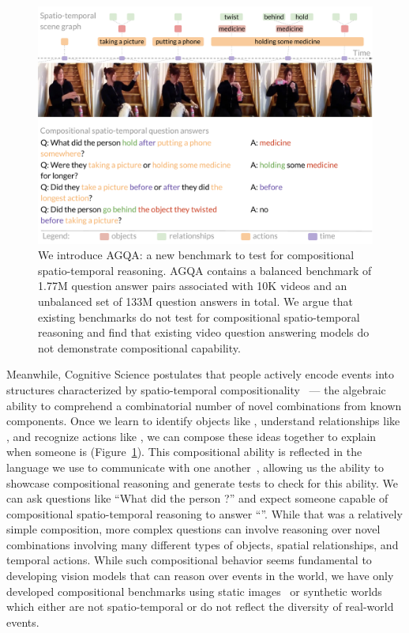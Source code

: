 \begin{figure}[t]
    \centering
    \includegraphics[width=\columnwidth]{figures/pull.pdf}
    \caption{We introduce AGQA: a new benchmark to test for compositional spatio-temporal reasoning. AGQA contains a balanced benchmark of 1.77M question answer pairs associated with 10K videos and an unbalanced set of 133M question answers in total. We argue that existing benchmarks do not test for compositional spatio-temporal reasoning and find that existing video question answering models do not demonstrate compositional capability.}
    \label{fig:pull}
\end{figure}

Meanwhile, Cognitive Science postulates that people actively encode events into structures characterized by spatio-temporal compositionality~\cite{michotte2017perception,barker1951one,tani2014self,schulz2016probing} --- the algebraic ability to comprehend a combinatorial number of novel combinations from known components. Once we learn to identify objects like , understand relationships like , and recognize actions like , we can compose these ideas together to explain when someone is      (Figure~\ref{fig:pull}). This compositional ability is reflected in the language we use to communicate with one another~\cite{chomsky2002syntactic,montague1970universal}, allowing us the ability to showcase compositional reasoning and generate tests to check for this ability. We can ask questions like ``What did the person   ?'' and expect someone capable of compositional spatio-temporal reasoning to answer ``''. While
that was a relatively simple composition, more complex questions can involve reasoning over novel combinations involving many different types of objects, spatial relationships, and temporal actions. While such compositional behavior seems fundamental to developing vision models that can reason over events in the world, we have only developed compositional benchmarks using static images~\cite{hudson2019gqa} or synthetic worlds~\cite{lake2018generalization,yi2019clevrer} which either are not spatio-temporal or do not reflect the diversity of real-world events.

